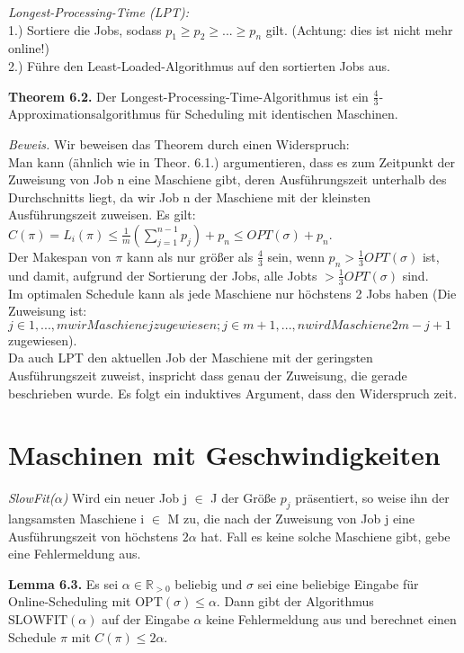 \textit{Longest-Processing-Time (LPT):} \\
1.) Sortiere die Jobs, sodass $p_{1} \ge p_{2} \ge ... \ge p_{n}$  gilt. (Achtung: dies ist nicht mehr online!)\\
2.) Führe den Least-Loaded-Algorithmus auf den sortierten Jobs aus.

\textbf{Theorem 6.2.} Der Longest-Processing-Time-Algorithmus ist ein $\frac{4}{3}$-Approximationsalgorithmus für Scheduling mit identischen Maschinen.

\textit{Beweis.} Wir beweisen das Theorem durch einen Widerspruch: \\
Man kann (ähnlich wie in Theor. 6.1.) argumentieren, dass es zum Zeitpunkt der Zuweisung von Job n eine Maschiene gibt, deren Ausführungszeit unterhalb des Durchschnitts liegt, da wir Job n der Maschiene mit der kleinsten Ausführungszeit zuweisen. Es gilt: \\
$C(\pi) = L_{i}(\pi) \le \tfrac{1}{m} ( \sum_{j=1}^{n-1} p_{j}) +p_{n} \le OPT(\sigma) + p_{n}$. \\
Der Makespan von $\pi$ kann als nur größer als $\tfrac{4}{3}$ sein, wenn $p_{n} > \tfrac{1}{3} OPT(\sigma)$ ist, und damit, aufgrund der Sortierung der Jobs, alle Jobts $> \tfrac{1}{3} OPT(\sigma)$  sind.\\
Im optimalen Schedule kann als jede Maschiene nur höchstens 2 Jobs haben (Die Zuweisung ist: $j \in {1, ..., m} wir Maschiene j zugewiesen;  j \in {m+1, ..., n} wird Maschiene 2m - j + 1$ zugewiesen).\\ 
Da auch LPT den aktuellen Job der Maschiene mit der geringsten Ausführungszeit zuweist, inspricht dass genau der Zuweisung, die gerade beschrieben wurde. Es folgt ein induktives Argument, dass den Widerspruch zeit.

\section{Maschinen mit Geschwindigkeiten}

\textit{SlowFit($\alpha$)} Wird ein neuer Job j $\in$ J der Größe $p_{j}$ präsentiert, so weise ihn der langsamsten Maschiene i $\in$ M zu, die nach der Zuweisung von Job j eine Ausführungszeit von höchstens $2 \alpha$ hat. Fall es keine solche Maschiene gibt, gebe eine Fehlermeldung aus.

\textbf{Lemma 6.3.} Es sei $\alpha \in \mathbb{R}_{>0}$ beliebig und $\sigma$ sei eine beliebige Eingabe für Online-Scheduling mit $\textrm{OPT}(\sigma) \leq \alpha$. Dann gibt der Algorithmus $\textrm{SLOWFIT}(\alpha)$ auf der Eingabe $\alpha$ keine Fehlermeldung aus und berechnet einen Schedule $\pi$ mit $C(\pi) \leq 2 \alpha$.


